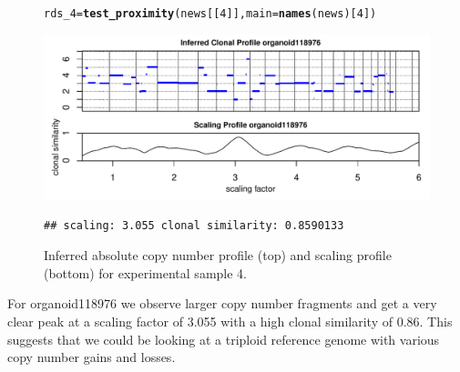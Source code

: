 \documentclass[12pt]{article}\usepackage[]{graphicx}\usepackage[]{color}
\makeatletter
\newcommand{\hlnum}[1]{\textcolor[rgb]{0.686,0.059,0.569}{#1}}%
\newcommand{\hlstd}[1]{\textcolor[rgb]{0.345,0.345,0.345}{#1}}%
\newcommand{\hlkwb}[1]{\textcolor[rgb]{0.69,0.353,0.396}{#1}}%
\newcommand{\hlkwc}[1]{\textcolor[rgb]{0.333,0.667,0.333}{#1}}%
\newcommand{\hlkwd}[1]{\textcolor[rgb]{0.737,0.353,0.396}{\textbf{#1}}}%
\newenvironment{kframe}{%
 \def\at@end@of@kframe{}%
 \ifinner\ifhmode%
  \def\at@end@of@kframe{\end{minipage}}%
  \begin{minipage}{\columnwidth}%
 \fi\fi%
 \def\FrameCommand##1{\hskip\@totalleftmargin \hskip-\fboxsep
 \colorbox{shadecolor}{##1}\hskip-\fboxsep
     \hskip-\linewidth \hskip-\@totalleftmargin \hskip\columnwidth}%
 \MakeFramed {\advance\hsize-\width
   \@totalleftmargin\z@ \linewidth\hsize
   \@setminipage}}%
 {\par\unskip\endMakeFramed%
 \at@end@of@kframe}
\newenvironment{knitrout}{}{} %
\makeatother
\begin{document}
\begin{figure}[h!]
  \centering
\begin{knitrout}
\color{fgcolor}\begin{kframe}
\begin{alltt}
\hlstd{rds_4} \hlkwb{=} \hlkwd{test_proximity}\hlstd{(news[[}\hlnum{4}\hlstd{]],} \hlkwc{main} \hlstd{=} \hlkwd{names}\hlstd{(news)[}\hlnum{4}\hlstd{])}
\end{alltt}
\end{kframe}
\includegraphics[width=.95\linewidth]{figure/unnamed-chunk-18-1} 
\begin{kframe}\begin{verbatim}
## scaling: 3.055 clonal similarity: 0.8590133
\end{verbatim}
\end{kframe}
\end{knitrout}
\caption{Inferred absolute copy number profile (top) and scaling profile (bottom) for experimental sample 4.}
\label{fig:samp4}
\end{figure}

For organoid118976 we observe larger copy number fragments and get a very clear peak at a scaling factor of 3.055 with a high clonal similarity of 0.86. This suggests that we could be looking at a triploid reference genome with various copy number gains and losses.

\newpage
\end{document}
